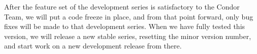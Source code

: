 After the feature set of the development series is satisfactory to the
Condor Team, we will put a code freeze in place, and from that point
forward, only bug fixes will be made to that development series.
When we have fully tested this version, we will release a new stable
series, resetting the minor version number, and start work on a new
development release from there.












